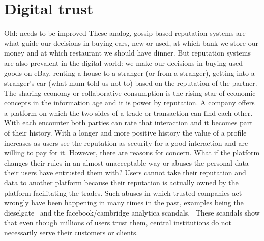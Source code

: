 \section{Digital trust}
{\color{red} Old: needs to be improved}
These analog, gossip-based reputation systems are what guide our decisions in buying cars, new or 
used, at which bank we store our money and at which restaurant we should have dinner.
But reputation systems are also prevalent in the digital world: we make our decisions in buying used goods 
on eBay, renting a house to a stranger (or from a stranger), getting into a stranger's car 
(what mum told us not to) based on the reputation of the partner. The sharing economy or collaborative consumption is the 
rising star of economic concepts in the information age and it is power by reputation. A company 
offers a platform on which the two sides of a trade or transaction can find each other. With each 
encounter both parties can rate that interaction and it becomes part of their history. With a longer
and more positive history the value of a profile increases as users see the reputation as security
for a good interaction and are willing to pay for it. However, there are reasons for concern. What
if the platform changes their rules in an almost unacceptable way or abuses the personal data their
users have entrusted them with? Users cannot take their reputation and data to another platform
because their reputation is actually owned by the platform facilitating the trades. Such abuses
in which trusted companies act wrongly have been happening in many times in the past, examples being
the dieselgate~\cite{VWDiesel} and the facebook/cambridge analytica scandals.~\cite{facebook} These
scandals show that even though millions of users trust them, central institutions do not necessarily
serve their customers or clients. 

